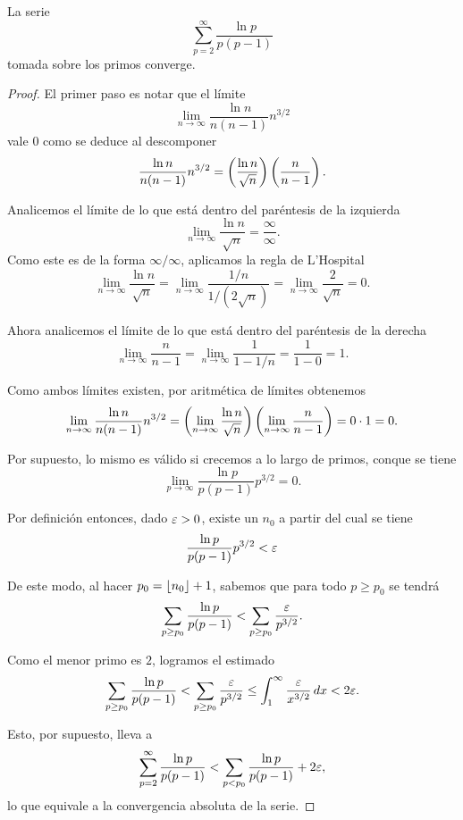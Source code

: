 \begin{lemma}
  \label{lem:sum-lnp}
  La serie
  \[
    \sum_{p = 2}^{\infty} \frac{\ln p}{p (p - 1)}
  \]
  tomada sobre los primos converge.
\end{lemma}

\begin{proof}
  El primer paso es notar que el l\'imite
  \[
    \lim_{n \to \infty} \frac{\ln n}{n (n - 1)} n^{3/2}
  \]
  vale \(0\) como se deduce al descomponer 
  \[
    \frac{\ln n}{n (n - 1)} n^{3/2}
    = \left( \frac{\ln n}{\sqrt{n}} \right)\left( \frac{n}{n - 1} \right).
  \]
  
  Analicemos el l\'imite de lo que est\'a dentro del par\'entesis de la izquierda
  \[
    \lim_{n \to \infty} \frac{\ln n}{\sqrt{n}} = \frac{\infty}{\infty}.
  \]
  Como este es de la forma \(\infty / \infty\), aplicamos la regla de L'Hospital
  \[
    \lim_{n \to \infty} \frac{\ln n}{\sqrt{n}}
    = \lim_{n \to \infty}\frac{1/n}{1/(2\sqrt{n})}
    = \lim_{n \to \infty} \frac{2}{\sqrt{n}} = 0.
  \]
  
  Ahora analicemos el l\'imite de lo que est\'a dentro del par\'entesis de la derecha
  \[
    \lim_{n \to \infty} \frac{n}{n - 1}
    = \lim_{n \to \infty} \frac{1}{1 - 1/n}
    = \frac{1}{1 - 0} = 1.
  \]
  
  Como ambos l\'imites existen, por aritm\'etica de l\'imites obtenemos
  \[
    \lim_{n \to \infty} \frac{\ln n}{n (n - 1)} n^{3/2}
    = \left( \lim_{n \to \infty} \frac{\ln n}{\sqrt{n}} \right)
    \left( \lim_{n \to \infty} \frac{n}{n - 1} \right)
    = 0 \cdot 1
    = 0.
  \]
  
  Por supuesto, lo mismo es v\'alido si crecemos a lo largo de primos, conque se tiene 
  \[
    \lim_{p \to \infty} \frac{\ln p}{p (p - 1)} p^{3/2}=0.
  \]
  
  Por definici\'on entonces, dado \(\varepsilon > 0\), existe un \(n_0\) a partir del cual se tiene
  \[
    \frac{\ln p}{p (p - 1)} p^{3/2} < \varepsilon
  \]
  
  De este modo, al hacer \(p_0 = \left\lfloor n_0 \right\rfloor + 1\),
  sabemos que para todo \(p \geq p_0\) se tendr\'a 
  \[
    \sum_{p \geq p_0} \frac{\ln p}{p (p - 1)}
    < \sum_{p \geq p_0} \frac{\varepsilon}{p^{3/2}}.
  \]
  
  Como el menor primo es \(2\), logramos el estimado
  \[
    \sum_{p \geq p_0} \frac{\ln p}{p (p - 1)}
    < \sum_{p \geq p_0} \frac{\varepsilon}{p^{3/2}}
    \le \int_{1}^\infty \frac{\varepsilon}{x^{3/2}} \, dx
    < 2 \varepsilon.
  \]
  
  Esto, por supuesto, lleva a
  \[
    \sum_{p = 2}^\infty \frac{\ln p}{p (p - 1)}
    < \sum_{p < p_0} \frac{\ln p}{p (p - 1)} + 2 \varepsilon,
  \]
  lo que equivale a la convergencia absoluta de la serie.
\end{proof}

